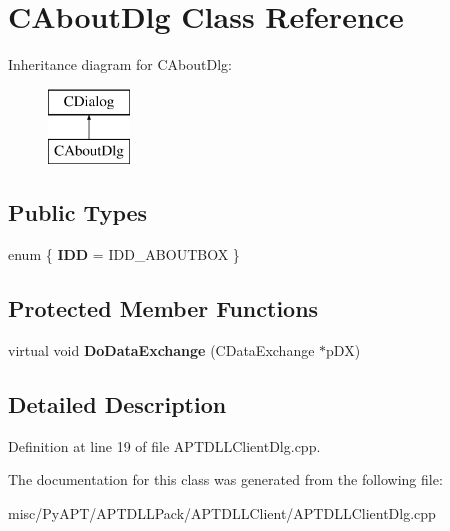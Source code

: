 \hypertarget{class_c_about_dlg}{}\section{C\+About\+Dlg Class Reference}
\label{class_c_about_dlg}
Inheritance diagram for C\+About\+Dlg\+:\begin{figure}[H]
\begin{center}
\leavevmode
\includegraphics[height=2.000000cm]{class_c_about_dlg}
\end{center}
\end{figure}
\subsection*{Public Types}
\begin{DoxyCompactItemize}
\item 
enum \{ {\bfseries I\+DD} = I\+D\+D\+\_\+\+A\+B\+O\+U\+T\+B\+OX
 \}\hypertarget{class_c_about_dlg_a27a5d4c47f16acb8562522fcd22871f7}{}\label{class_c_about_dlg_a27a5d4c47f16acb8562522fcd22871f7}

\end{DoxyCompactItemize}
\subsection*{Protected Member Functions}
\begin{DoxyCompactItemize}
\item 
virtual void {\bfseries Do\+Data\+Exchange} (C\+Data\+Exchange $\ast$p\+DX)\hypertarget{class_c_about_dlg_ab83db7484fec957282d7d5a21aed4df4}{}\label{class_c_about_dlg_ab83db7484fec957282d7d5a21aed4df4}

\end{DoxyCompactItemize}


\subsection{Detailed Description}


Definition at line 19 of file A\+P\+T\+D\+L\+L\+Client\+Dlg.\+cpp.



The documentation for this class was generated from the following file\+:\begin{DoxyCompactItemize}
\item 
misc/\+Py\+A\+P\+T/\+A\+P\+T\+D\+L\+L\+Pack/\+A\+P\+T\+D\+L\+L\+Client/A\+P\+T\+D\+L\+L\+Client\+Dlg.\+cpp\end{DoxyCompactItemize}
